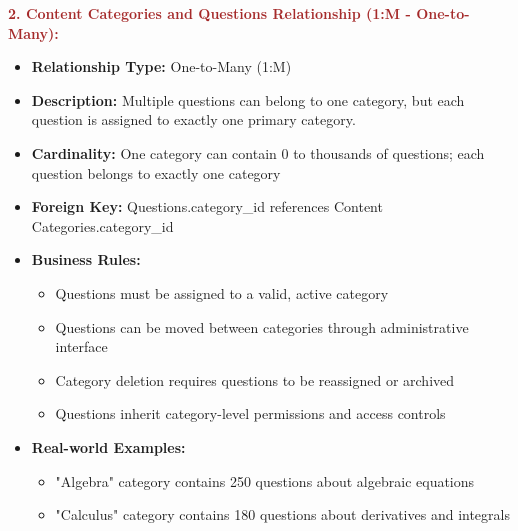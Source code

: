 \documentclass[12pt,a4paper,oneside]{book}
\begin{document}
\textbf{\textcolor{brown}{2. Content Categories and Questions Relationship (1:M - One-to-Many):}}
\begin{itemize}
    \item \textbf{Relationship Type:} One-to-Many (1:M)
    \item \textbf{Description:} Multiple questions can belong to one category, but each question is assigned to exactly one primary category.
    \item \textbf{Cardinality:} One category can contain 0 to thousands of questions; each question belongs to exactly one category
    \item \textbf{Foreign Key:} Questions.category\_id references Content Categories.category\_id
    \item \textbf{Business Rules:}
        \begin{itemize}
            \item Questions must be assigned to a valid, active category
            \item Questions can be moved between categories through administrative interface
            \item Category deletion requires questions to be reassigned or archived
            \item Questions inherit category-level permissions and access controls
        \end{itemize}
    \item \textbf{Real-world Examples:}
        \begin{itemize}
            \item "Algebra" category contains 250 questions about algebraic equations
            \item "Calculus" category contains 180 questions about derivatives and integrals
        \end{itemize}
\end{itemize}
\end{document}

